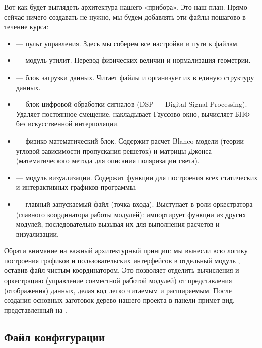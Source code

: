 Вот как будет выглядеть архитектура нашего «прибора». Это наш план. Прямо сейчас ничего создавать не нужно, мы будем добавлять эти файлы пошагово в течение курса:
\begin{itemize}
    \item {} --- пульт управления. Здесь мы соберем все настройки и пути к файлам.
    \item {} --- модуль утилит. Перевод физических величин и нормализация геометрии.
    \item {} --- блок загрузки данных. Читает файлы и организует их в единую структуру данных.
    \item {} --- блок цифровой обработки сигналов (DSP --- Digital Signal Processing). Удаляет постоянное смещение, накладывает Гауссово окно, вычисляет БПФ без искусственной интерполяции.
    \item {} --- физико-математический блок. Содержит расчет Blanco-модели (теории угловой зависимости пропускания решеток) и матрицы Джонса (математического метода для описания поляризации света).
    \item {} --- модуль визуализации. Содержит функции для построения всех статических и интерактивных графиков программы.
    \item {} --- главный запускаемый файл (точка входа). Выступает в роли оркестратора (главного координатора работы модулей): импортирует функции из других модулей, последовательно вызывая их для выполнения расчетов и визуализации.
\end{itemize}

Обрати внимание на важный архитектурный принцип: мы вынесли всю логику построения графиков и пользовательских интерфейсов в отдельный модуль , оставив файл  чистым координатором. Это позволяет отделить вычисления и оркестрацию (управление совместной работой модулей) от представления (отображения) данных, делая код легко читаемым и расширяемым. После создания основных заготовок дерево нашего проекта в панели  примет вид, представленный на .


\subsection{Файл конфигурации}

